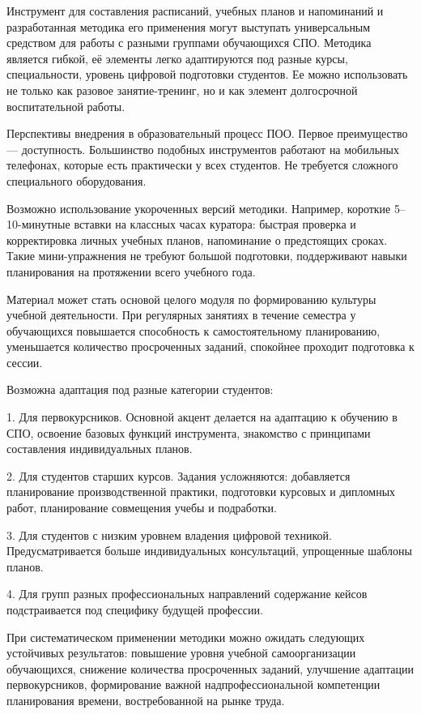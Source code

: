 \documentclass[
]{article}
\begin{document}
Инструмент для составления расписаний, учебных планов и напоминаний и
разработанная методика его применения могут выступать универсальным
средством для работы с разными группами обучающихся СПО. Методика
является гибкой, её элементы легко адаптируются под разные курсы,
специальности, уровень цифровой подготовки студентов. Ее можно
использовать не только как разовое занятие-тренинг, но и как элемент
долгосрочной воспитательной работы.

Перспективы внедрения в образовательный процесс ПОО. Первое преимущество
--- доступность. Большинство подобных инструментов работают на мобильных
телефонах, которые есть практически у всех студентов. Не требуется
сложного специального оборудования.

Возможно использование укороченных версий методики. Например, короткие
5--10-минутные вставки на классных часах куратора: быстрая проверка и
корректировка личных учебных планов, напоминание о предстоящих сроках.
Такие мини-упражнения не требуют большой подготовки, поддерживают навыки
планирования на протяжении всего учебного года.

Материал может стать основой целого модуля по формированию культуры
учебной деятельности. При регулярных занятиях в течение семестра у
обучающихся повышается способность к самостоятельному планированию,
уменьшается количество просроченных заданий, спокойнее проходит
подготовка к сессии.

Возможна адаптация под разные категории студентов:

1. Для первокурсников. Основной акцент делается на адаптацию к обучению
в СПО, освоение базовых функций инструмента, знакомство с принципами
составления индивидуальных планов.

2. Для студентов старших курсов. Задания усложняются: добавляется
планирование производственной практики, подготовки курсовых и дипломных
работ, планирование совмещения учебы и подработки.

3. Для студентов с низким уровнем владения цифровой техникой.
Предусматривается больше индивидуальных консультаций, упрощенные шаблоны
планов.

4. Для групп разных профессиональных направлений содержание кейсов
подстраивается под специфику будущей профессии.

При систематическом применении методики можно ожидать следующих
устойчивых результатов: повышение уровня учебной самоорганизации
обучающихся, снижение количества просроченных заданий, улучшение
адаптации первокурсников, формирование важной надпрофессиональной
компетенции планирования времени, востребованной на рынке труда.
\end{document}
